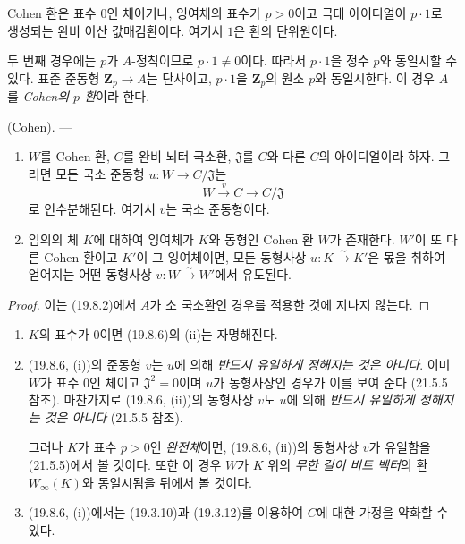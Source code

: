 \begin{proposition}[19.8.5]
\label{0.19.8.5-ko}
Cohen 환은 표수 $0$인 체이거나, 잉여체의 표수가 $p>0$이고
극대 아이디얼이 $p\cdot1$로 생성되는 완비 이산 값매김환이다.
여기서 $1$은 환의 단위원이다.
\end{proposition}

두 번째 경우에는 $p$가 $A$-정칙이므로 $p\cdot1\neq0$이다. 따라서
$p\cdot1$을 정수 $p$와 동일시할 수 있다. 표준 준동형
$\mathbf Z_p\to A$는 단사이고, $p\cdot1$을 $\mathbf Z_p$의 원소
$p$와 동일시한다. 이 경우 $A$를 \emph{Cohen의 $p$-환}이라 한다.

\begin{theorem}[19.8.6]
\label{0.19.8.6-ko}
\textup{(Cohen).} ---
\begin{enumerate}
  \item[(i)] $W$를 Cohen 환, $C$를 완비 뇌터 국소환,
  $\mathfrak J$를 $C$와 다른 $C$의 아이디얼이라 하자. 그러면 모든
  국소 준동형 $u:W\to C/\mathfrak J$는
  \[
    W\xrightarrow{v}C\longrightarrow C/\mathfrak J
  \]
  로 인수분해된다. 여기서 $v$는 국소 준동형이다.
  \item[(ii)] 임의의 체 $K$에 대하여 잉여체가 $K$와 동형인 Cohen 환
  $W$가 존재한다. $W'$이 또 다른 Cohen 환이고 $K'$이 그 잉여체이면,
  모든 동형사상 $u:K\xrightarrow{\sim}K'$은 몫을 취하여 얻어지는
  어떤 동형사상 $v:W\xrightarrow{\sim}W'$에서 유도된다.
\end{enumerate}
\end{theorem}

\begin{proof}
이는 (19.8.2)에서 $A$가 소 국소환인 경우를 적용한 것에 지나지 않는다.
\end{proof}

\begin{remarks}[19.8.7]
\label{0.19.8.7-ko}
\begin{enumerate}
  \item[(i)] $K$의 표수가 $0$이면 (19.8.6)의 (ii)는 자명해진다.
  \item[(ii)] (19.8.6, (i))의 준동형 $v$는 $u$에 의해
  \emph{반드시 유일하게 정해지는 것은 아니다}. 이미 $W$가 표수
  $0$인 체이고 $\mathfrak J^2=0$이며 $u$가 동형사상인 경우가 이를
  보여 준다 (21.5.5 참조). 마찬가지로 (19.8.6, (ii))의 동형사상
  $v$도 $u$에 의해 \emph{반드시 유일하게 정해지는 것은 아니다}
  (21.5.5 참조).

  그러나 $K$가 표수 $p>0$인 \emph{완전체}이면, (19.8.6, (ii))의
  동형사상 $v$가 유일함을 (21.5.5)에서 볼 것이다. 또한 이 경우
  $W$가 $K$ 위의 \emph{무한 길이 비트 벡터}의 환
  $W_\infty(K)$와 동일시됨을 뒤에서 볼 것이다.
  \item[(iii)] (19.8.6, (i))에서는 (19.3.10)과 (19.3.12)를
  이용하여 $C$에 대한 가정을 약화할 수 있다.
\end{enumerate}
\end{remarks}

